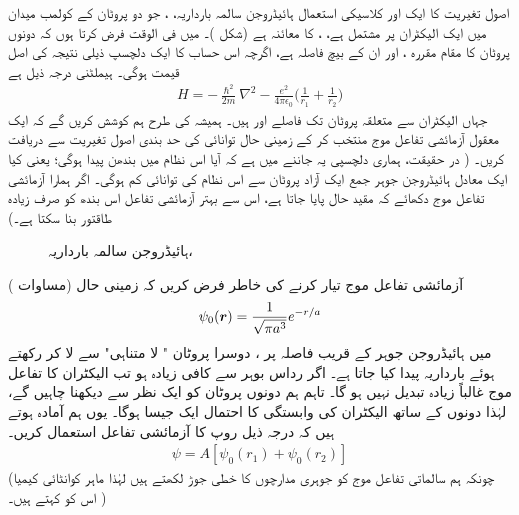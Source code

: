  اصول تغیریت کا ایک اور کلاسیکی استعمال ہائیڈروجن سالمہ بارداریہ،    ، جو  دو پروٹان کے کولمب میدان میں ایک الیکٹران پر مشتمل ہے، ،   کا معائنہ ہے  (شکل )۔  میں فی الوقت فرض کرتا ہوں کہ دونوں پروٹان کا مقام  مقررہ ،  اور ان کے بیچ فاصلہ  ہے،  اگرچہ اس حساب کا ایک دلچسپ ذیلی نتیجہ  کی اصل قیمت ہوگی۔ ہیملٹنی درجہ ذیل ہے
 \begin{align}
H=-\frac{\hslash^{2}}{2m}\nabla^{2}-\frac{e^{2}}{4\pi\epsilon_{0}}\big(\frac{1}{r_{1}}+\frac{1}{r_{2}}\big)
\end{align}
 جہاں الیکٹران سے متعلقہ پروٹان تک فاصلے  اور  ہیں۔ ہمیشہ کی طرح ہم کوشش کریں گے کہ ایک معقول   آزمائشی  تفاعل موج  منتخب  کر کے زمینی حال توانائی کی حد بندی اصول تغیریت سے دریافت کریں۔ ( در حقیقت،  ہماری دلچسپی یہ جاننے میں ہے  کہ آیا اس نظام میں بندھن  پیدا ہوگی؛  یعنی کیا  ایک معادل ہائیڈروجن جوہر جمع ایک آزاد پروٹان سے  اس نظام کی توانائی کم ہوگی۔ اگر ہمارا آزمائشی  تفاعل موج دکھائے کہ  مقید حال پایا جاتا ہے،  اس سے  بہتر آزمائشی  تفاعل اس بندھ  کو صرف زیادہ  طاقتور بنا سکتا ہے۔)
\begin{figure} \centering
{} 
\caption{ہائیڈروجن سالمہ بارداریہ، } 
\label{شکل_تغیریت_ہائیڈروجن_سالمہ_بارداریہ} 
\end{figure} 

 آزمائشی تفاعل موج تیار کرنے کی خاطر فرض کریں کہ  زمینی حال  (مساوات )
\begin{align}
\psi_{0}({{\boldsymbol{r}}})=\frac{1}{\sqrt{\pi a^{3}}}e^{-r/a} 
\end{align}
  میں  ہائیڈروجن جوہر کے قریب  فاصلہ  پر ،   دوسرا پروٹان "    لا متناہی" سے  لا کر رکھتے ہوئے   بارداریہ پیدا کیا جاتا ہے۔ اگر رداس بوہر سے  کافی زیادہ  ہو تب الیکٹران کا تفاعل موج غالباً زیادہ تبدیل نہیں ہو گا۔ تاہم ہم دونوں پروٹان کو ایک نظر سے دیکھنا  چاہیں گے،  لہٰذا دونوں  کے ساتھ الیکٹران کی وابستگی کا احتمال ایک  جیسا ہوگا۔ یوں ہم آمادہ ہوتے ہیں  کہ  درجہ ذیل روپ کا آزمائشی تفاعل استعمال کریں۔ 
 \begin{align}
\psi=A[\psi_{0}(r_{1})+\psi_{0}(r_{2})]
\end{align}
(چونکہ ہم سالماتی    تفاعل موج کو جوہری مدارچوں کا خطی جوڑ لکھتے ہیں لہٰذا ماہر کوانٹائی  کیمیا اس  کو  کہتے ہیں۔ )

